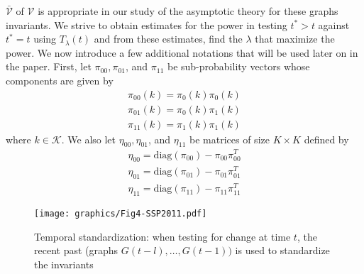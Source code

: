 \documentclass[final]{IEEEtran}
\theoremstyle{definition}
\begin{document}
 $\bar{\mathscr{V}}$ of $\mathscr{V}$ is appropriate in our study of the 
asymptotic theory for these graphs invariants. We strive to
obtain estimates for the power in testing $t^{*} > t$ against $t^{*} =
t$ using $T_{\lambda}(t)$ and from these estimates, find the $\lambda$
that maximize the power. We now introduce a few
additional notations that will be used later on in the paper. First,
let $\pi_{00}, \pi_{01}$, and $\pi_{11}$ be sub-probability vectors
whose components are given by
\begin{gather*}
  \pi_{00}(k) = \pi_{0}(k) \pi_{0}(k) \\
  \pi_{01}(k) = \pi_{0}(k) \pi_{1}(k) \\
  \pi_{11}(k) = \pi_{1}(k) \pi_{1}(k)
\end{gather*}
where $k \in \mathscr{K}$. We also let $\eta_{00}, \eta_{01}$, and
$\eta_{11}$ be matrices of size $K \times K$ defined by 
\begin{gather*}
  \eta_{00} = \mathrm{diag}(\pi_{00}) - \pi_{00} \pi_{00}^{T} \\
  \eta_{01} = \mathrm{diag}(\pi_{01}) - \pi_{01} \pi_{01}^{T} \\
  \eta_{11} = \mathrm{diag}(\pi_{11}) - \pi_{11} \pi_{11}^{T}
\end{gather*}
\begin{figure}[htbp]
  \centering
  \texttt{[image: graphics/Fig4-SSP2011.pdf]}
  \caption{Temporal standardization: when testing for change at time
    $t$, the recent past (graphs $G(t - l), \dots, G(t-1))$ is used to
    standardize the invariants}
  \label{fig:temporal}
\end{figure}
\end{document}
